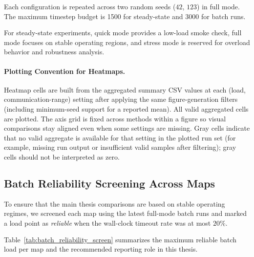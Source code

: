 Each configuration is repeated across two random seeds ($42$, $123$) in full mode.
The maximum timestep budget is 1500 for steady-state and 3000 for batch runs.

For steady-state experiments, quick mode provides a low-load smoke check,
full mode focuses on stable operating regions, and stress mode is reserved
for overload behavior and robustness analysis.

\paragraph{Plotting Convention for Heatmaps.}
Heatmap cells are built from the aggregated summary CSV values at each
(load, communication-range) setting after applying the same figure-generation
filters (including minimum-seed support for a reported mean). All valid
aggregated cells are plotted. The axis grid is fixed across methods within a
figure so visual comparisons stay aligned even when some settings are missing.
Gray cells indicate that no valid aggregate is available for that setting in
the plotted run set (for example, missing run output or insufficient valid
samples after filtering); gray cells should not be interpreted as zero.


\subsection{Batch Reliability Screening Across Maps}
\label{subsec:exp_batch_reliability_screen}

To ensure that the main thesis comparisons are based on stable operating regimes,
we screened each map using the latest full-mode batch runs and marked a load point
as \emph{reliable} when the wall-clock timeout rate was at most $20\%$.

Table~\ref{tab:batch_reliability_screen} summarizes the maximum reliable batch load
per map and the recommended reporting role in this thesis.

